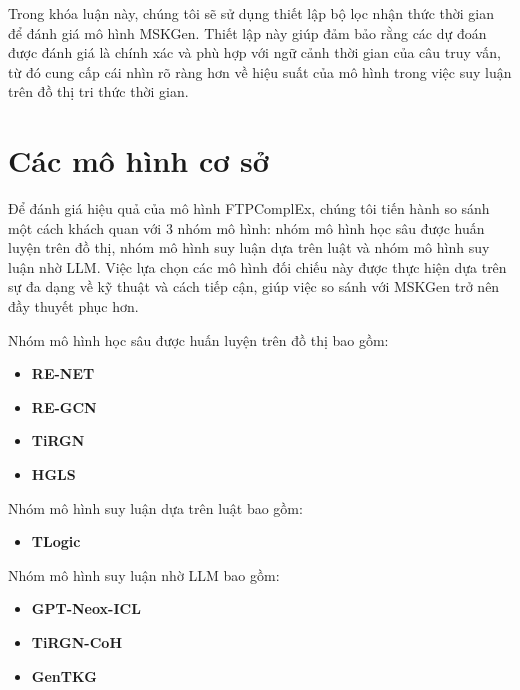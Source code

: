Trong khóa luận này, chúng tôi sẽ sử dụng thiết lập bộ lọc nhận thức thời gian để đánh giá mô hình MSKGen. Thiết lập này giúp đảm bảo rằng các dự đoán được đánh giá là chính xác và phù hợp với ngữ cảnh thời gian của câu truy vấn, từ đó cung cấp cái nhìn rõ ràng hơn về hiệu suất của mô hình trong việc suy luận trên đồ thị tri thức thời gian.
\section{Các mô hình cơ sở}
Để đánh giá hiệu quả của mô hình FTPComplEx, chúng tôi tiến hành so sánh một cách khách quan với 3 nhóm mô hình: nhóm mô hình học sâu được huấn luyện trên đồ thị, nhóm mô hình suy luận dựa trên luật và nhóm mô hình suy luận nhờ LLM. Việc lựa chọn các mô hình đối chiếu này được thực hiện dựa trên sự đa dạng về kỹ thuật và cách tiếp cận, giúp việc so sánh với MSKGen trở nên đầy thuyết phục hơn. 

Nhóm mô hình học sâu được huấn luyện trên đồ thị bao gồm:
\begin{itemize}
    \item \textbf{RE-NET}
    \item \textbf{RE-GCN}
    \item \textbf{TiRGN}
    \item \textbf{HGLS}
\end{itemize}

Nhóm mô hình suy luận dựa trên luật bao gồm:
\begin{itemize}
    \item \textbf{TLogic}
\end{itemize}

Nhóm mô hình suy luận nhờ LLM bao gồm:
\begin{itemize}
    \item \textbf{GPT-Neox-ICL}
    \item \textbf{TiRGN-CoH}
    \item \textbf{GenTKG}
\end{itemize}

